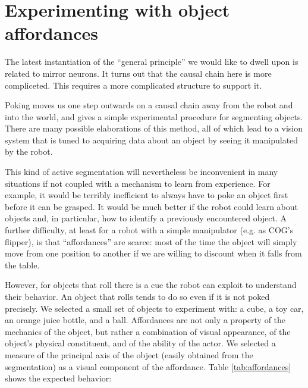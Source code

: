 
\section{Experimenting with object affordances}

\ifverbose
The latest instantiation of the ``general principle'' we would like to
dwell upon is related to mirror neurons. It turns out that the causal
chain here is more compliceted. This requires a more complicated
structure to support it.
\fi

Poking moves us one step outwards on a causal chain away from the
robot and into the world, and gives a simple experimental procedure
for segmenting objects.  There are many possible elaborations of this
method, all of which lead to a vision system that is tuned to 
acquiring data about an object by seeing it manipulated by the robot.  

This kind of active segmentation will nevertheless be inconvenient in many situations if not 
coupled with a mechanism to learn from experience. For example, it 
would be terribly inefficient to always have to poke an object first
before it can be grasped.
It would be much better if the robot could learn about
objects and, in particular, how to identify a previously encountered object. 
A further difficulty, at least for a robot with a simple 
manipulator (e.g. as COG's flipper), is that ``affordances'' are scarce: 
most of the time the object will simply move from one position
to another if we are willing to discount when it falls from the table.

However, for objects that roll there is a cue the robot can exploit
to understand their behavior. An object that rolls tends to do so even 
if it is not poked precisely. We selected a small set of objects to
experiment with: a cube, a toy car, an orange juice bottle, and a ball.
Affordances are not only a property of the mechanics of the object, but 
rather a combination of visual appearance, of the object's physical 
constituent, and of the ability of the actor. We selected a measure of
the principal axis of the object (easily obtained from the segmentation)
as a visual component of the affordance. Table \ref{tab:affordances} shows the expected
behavior:

